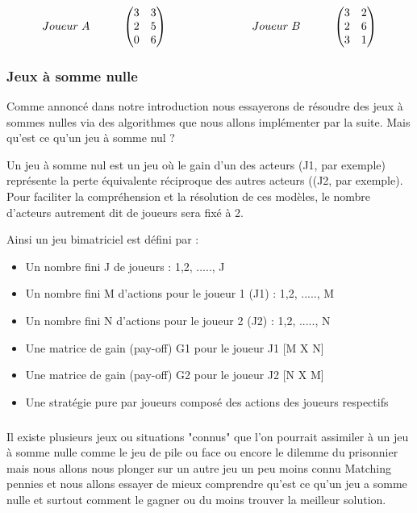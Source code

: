 \documentclass[a4paper, 12pt, twoside]{article}
\begin{document}
\[
Joueur\hspace{0,1cm} A\hspace{1cm}
\begin{pmatrix}3&3\\
2&5\\
0&6\\
\end{pmatrix}\                      \hspace{2,5cm}  
Joueur\hspace{0,1cm} B \hspace{1cm}  
\begin{pmatrix}3&2\\
2&6\\
3&1\\
\end{pmatrix} 
\]
\subsubsection{Jeux à somme nulle}
Comme annoncé dans notre introduction nous essayerons de résoudre des jeux à sommes nulles via des algorithmes que nous allons implémenter par la suite. Mais qu'est ce qu'un jeu à somme nul ? \newline

Un jeu à somme nul est un jeu où le gain d'un des acteurs (J1, par exemple) représente la perte équivalente réciproque des autres acteurs ((J2, par exemple). Pour faciliter la compréhension et la résolution de ces modèles, le nombre d'acteurs autrement dit de joueurs sera fixé à 2.\newline

Ainsi un \textsf{jeu bimatriciel} est défini par :
\begin{itemize}
\item Un nombre fini J de joueurs : {1,2, ....., J}
\item Un nombre fini M d'actions pour le joueur 1 (J1) : {1,2, ....., M}
\item Un nombre fini N d'actions pour le joueur 2 (J2) : {1,2, ....., N}
\item Une matrice de gain (pay-off) G1 pour le joueur J1  [M X N]
\item Une matrice de gain (pay-off) G2 pour le joueur J2  [N X M]
\item Une stratégie pure par joueurs composé des actions des joueurs respectifs
\end{itemize}
\subparagraph*{}{Il existe plusieurs jeux ou situations "connus" que l'on pourrait assimiler à un \textsf{jeu à somme nulle} comme le jeu de \textsf{pile ou face} ou encore \textsf{le dilemme du prisonnier} mais nous allons nous plonger sur un autre jeu un peu moins connu \textsf{Matching pennies} et nous allons essayer de mieux comprendre qu'est ce qu'un \textsf{jeu a somme nulle} et surtout comment le gagner ou du moins trouver la meilleur solution.}
\end{document}
